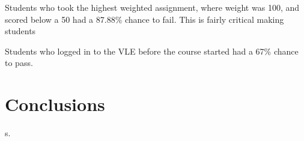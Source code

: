 \documentclass[12pt]{article}
\begin{document}
Students who took the highest weighted assignment, where weight was 100, and scored below a 50 had a 87.88\% chance to fail. This is fairly critical making students

Students who logged in to the VLE before the course started had a 67\% chance to pass. 

\clearpage
\section{Conclusions}s.




\clearpage


\end{document}
